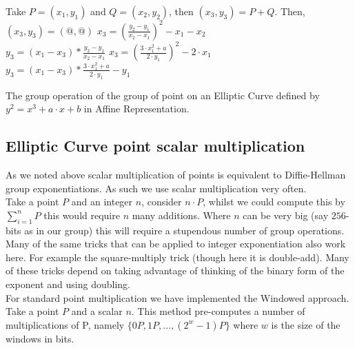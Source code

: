 \documentclass[ %
                    author={Nicholas Tutte},
                supervisor={Prof. Nigel Smart},
                    degree={MEng},
                     title={Secure Two Party Computation},
                  subtitle={A practical comparison of recent protocols},
                      type={Research - GG1K},
                      year={2015} ]{dissertation}
\begin{document}
			\begin{mdframed}
				\begin{algorithm}[H]
					Take $P = (x_1, y_1)$ and $Q = (x_2, y_2)$, then $(x_3, y_3) = P + Q$. Then,\\[0.15cm]
					{
						$(x_3, y_3) = (@, @)$
					}
					{
						{
							$x_3 = (\frac{y_2 - y_1}{x_2 - x_1})^2 - x_1 - x_2$\\
							$y_3 = (x_1 - x_3) * \frac{y_2 - y_1}{x_2 - x_1}$
						}
						{
							$x_3 = (\frac{3\cdot x_1^2 + a}{2 \cdot y_1}) ^ 2 - 2\cdot x_1$\\
							$y_3 = (x_1 - x_3) * \frac{3 \cdot x_1^2 + a}{2 \cdot y_1} - y_1$
						}
					}

					\caption{The group operation of the group of point on an Elliptic Curve defined by $y^2 = x^3 + a \cdot x + b$ in Affine Representation. \label{Algo:ECC_GroupOp}}
				\end{algorithm}
			\end{mdframed}

			\subsection{Elliptic Curve point scalar multiplication}
				As we noted above scalar multiplication of points is equivalent to Diffie-Hellman group exponentiations. As such we use scalar multiplication very often.\\

				Take a point $P$ and an integer $n$, consider $n \cdot P$, whilst we could compute this by $\sum_{i = 1}^{n}P$ this would require $n$ many additions. Where $n$ can be very big (say $256$-bits as in our group) this will require a stupendous number of group operations.\\

				 Many of the same tricks that can be applied to integer exponentiation also work here. For example the square-multiply trick (though here it is double-add). Many of these tricks depend on taking advantage of thinking of the binary form of the exponent and using doubling.\\

				 For standard point multiplication we have implemented the Windowed approach. Take a point $P$ and a scalar $n$. This method pre-computes a number of multiplications of P, namely $\{0P, 1P, ..., (2^{w} - 1)P\}$ where $w$ is the size of the windows in bits.\\
\end{document}
